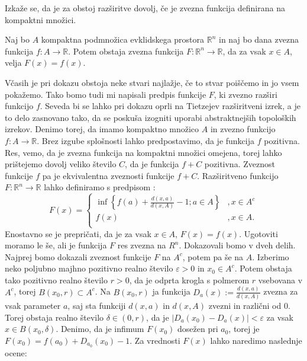 \documentclass[mat1]{fmfdelo}
\newcommand{\R}{\mathbb R}
\newcommand{\0}{\underline{0}}
\begin{document}
Izkaže se, da je za obstoj razširitve dovolj, če je zvezna funkcija definirana na kompaktni množici.

\begin{lema}\label{lem:razsiritev}
Naj bo $A$ kompaktna podmnožica evklidskega prostora $\R^n$ in naj bo dana zvezna funkcija $f : A \to \R$. Potem obstaja zvezna funkcija $F : \R^n \to \R$, da za vsak $x \in A$, velja $F(x) = f(x)$.
\end{lema}

\begin{dokaz}
Včasih je pri dokazu obstoja neke stvari najlažje, če to stvar poiščemo in jo vsem pokažemo. Tako bomo tudi mi napisali predpis funkcije $F$, ki zvezno razširi funkcijo $f$. Seveda bi se lahko pri dokazu oprli na Tietzejev razširitveni izrek, a je to delo zasnovano tako, da se poskuša izogniti uporabi abstraktnejših topoloških izrekov. Denimo torej, da imamo kompaktno množico $A$ in zvezno funkcijo \mbox{$f : A \to \R$}. Brez izgube splošnosti lahko predpostavimo, da je funkcija $f$ pozitivna. Res, vemo, da je zvezna funkcija na kompaktni množici omejena, torej lahko prištejemo dovolj veliko število $C$, da je funkcija $f + C$ pozitivna. Zveznost funkcije $f$ pa je ekvivalentna zveznosti funkcije $f + C$.
Razširitveno funkcijo \mbox{$F : \R^n \to \R$} lahko definiramo s predpisom :
\[  F(x) = \left \{
\begin{array}{ll}
	\inf \left \{ f(a) + \frac{d(x, a)}{d(x, A)} - 1; a \in A \right \} &, x \in A^c \\
	f(x) &, x \in A. \\
\end{array} 
\right. \]
Enostavno se je prepričati, da je za vsak $x \in A$, $F(x) = f(x)$. Ugotoviti moramo le še, ali je funkcija $F$ res zvezna na $R^n$.
Dokazovali bomo v dveh delih. Najprej bomo dokazali zveznost funkcije $F$ na $A^c$, potem pa še na $A$.
Izberimo neko poljubno majhno pozitivno realno število $\varepsilon > 0$ in $x_0 \in A^c$. Potem obstaja tako pozitivno realno število $r>0$, da je odprta krogla s polmerom $r$ vsebovana v $A^c$, torej $B(x_0, r) \subset A^c$. Na $B(x_0, r)$ ja funkcija $D_a(x) := \frac{d(x, a)}{d(x, A)}$ zvezna za vsak parameter $a$, saj sta funkciji $d(x, a)$ in $d(x, A)$ zvezni in različni od $0$. Torej obstaja realno število $\delta \in (0, r)$, da je $|D_a(x_0) - D_a(x)| < \varepsilon$ za vsak $x \in B(x_0, \delta)$.
Denimo, da je infimum $F(x_0)$ dosežen pri $a_0$, torej je $F(x_0) = f(a_0) + D_{a_0}(x_0) - 1$. Za vrednosti $F(x)$ lahko naredimo naslednje ocene:

\end{dokaz}
\end{document}
